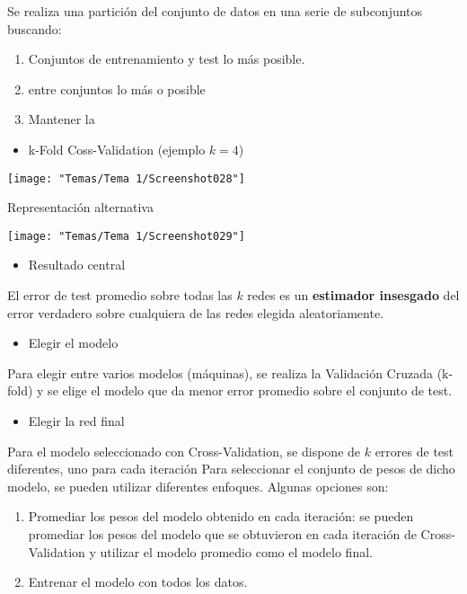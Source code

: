 Se realiza una partición del conjunto de datos en una serie de subconjuntos buscando:
\begin{enumerate}[label=\color{lightblue}\arabic*)]
	\item Conjuntos de entrenamiento y test lo más  posible.
	\item {} entre conjuntos lo más  o posible
	\item Mantener la 
\end{enumerate}
\begin{itemize}[label=\color{red}\textbullet, leftmargin=*]
	\item \color{lightblue}k-Fold Coss-Validation (ejemplo $k=4$)
\end{itemize}
\begin{center}
	\texttt{[image: "Temas/Tema 1/Screenshot028"]}
\end{center}
Representación alternativa
\begin{center}
	\texttt{[image: "Temas/Tema 1/Screenshot029"]}
\end{center}
\begin{itemize}[label=\color{red}\textbullet, leftmargin=*]
	\item \color{lightblue}Resultado central
\end{itemize}
El error de test promedio sobre todas las $k$ redes es un \textbf{estimador insesgado} del error verdadero sobre cualquiera de las redes elegida aleatoriamente.
\begin{itemize}[label=\color{red}\textbullet, leftmargin=*]
	\item \color{lightblue}Elegir el modelo
\end{itemize}
Para elegir entre varios modelos (máquinas), se realiza la Validación Cruzada (k-fold) y se elige el modelo que da menor error promedio sobre el conjunto de test.
\begin{itemize}[label=\color{red}\textbullet, leftmargin=*]
	\item \color{lightblue}Elegir la red final
\end{itemize}
Para el modelo seleccionado con Cross-Validation, se dispone de $k$ errores de test diferentes, uno para cada iteración Para seleccionar el conjunto de pesos de dicho modelo, se pueden utilizar diferentes enfoques. Algunas opciones son:
\begin{enumerate}[label=\arabic*)]
	\item Promediar los pesos del modelo obtenido en cada iteración: se pueden promediar los pesos del modelo que se obtuvieron en cada iteración de Cross-Validation y utilizar el modelo promedio como el modelo final.
	\item Entrenar el modelo con todos los datos.
\end{enumerate}
